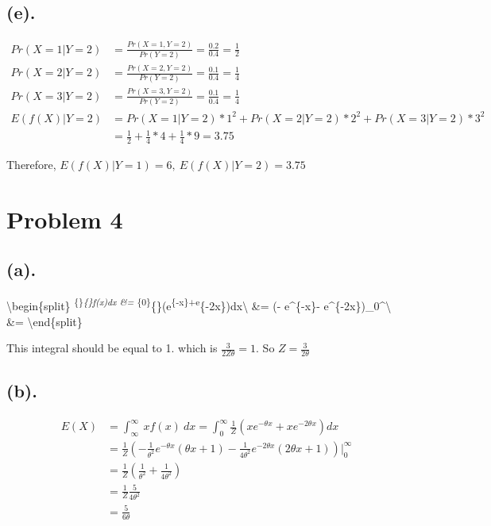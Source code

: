 \documentclass[11pt]{article}
\begin{document}
    \hypertarget{e.}{%
\subsection{(e).}\label{e.}}

\begin{align*}
Pr(X = 1 | Y = 2) &= \frac{Pr(X=1,Y=2)}{Pr(Y=2)}=\frac{0.2}{0.4}=\frac{1}{2}\\
Pr(X = 2 | Y = 2) &= \frac{Pr(X=2,Y=2)}{Pr(Y=2)}=\frac{0.1}{0.4}=\frac{1}{4}\\
Pr(X = 3 | Y = 2) &= \frac{Pr(X=3,Y=2)}{Pr(Y=2)}=\frac{0.1}{0.4}=\frac{1}{4}\\
E(f(X)|Y=2) &= Pr(X = 1 | Y = 2)*1^2+Pr(X = 2 | Y = 2)*2^2+Pr(X = 3 | Y = 2)*3^2\\
&=\frac{1}{2}+\frac{1}{4}*4+\frac{1}{4}*9=3.75
\end{align*}

Therefore, \(E(f(X)|Y=1) =6,~E(f(X)|Y=2)=3.75\)

    \hypertarget{problem-4}{%
\section{Problem 4}\label{problem-4}}

    \hypertarget{a.}{%
\subsection{(a).}\label{a.}}

\textbackslash{}begin\{split\}
\int\textsuperscript{\{\infty\}\emph{\{\infty\}f(x)dx \&=
\int}\{0\}}\{\infty\}(e\textsuperscript{\{-\theta x\}+e}\{-2\theta x\})dx\textbackslash{}
\&= (-  e\^{}\{-\theta x\}-
e\^{}\{-2\theta x\})\Big\textbar{}\_0\^{}\infty\textbackslash{}
\&= \textbackslash{}end\{split\}

    This integral should be equal to 1. which is \(\frac{3}{2Z\theta}=1\).
So \(Z=\frac{3}{2\theta}\)

    \hypertarget{b.}{%
\subsection{(b).}\label{b.}}

\begin{align*}
E(X)&=\int^{\infty}_{\infty}~xf(x)~dx = \int_{0}^{\infty}\frac{1}{Z}(xe^{-\theta x}+xe^{-2\theta x})dx\\
&=\frac{1}{Z} (-\frac{1}{\theta^2} e^{-\theta x}(\theta x+1)-\frac{1}{4\theta^2} e^{-2\theta x}(2\theta x+1))\Big|_0^\infty\\
&=\frac{1}{Z}(\frac{1}{\theta^2}+\frac{1}{4\theta^2})\\
&=\frac{1}{Z}\frac{5}{4\theta^2}\\
&=\frac{5}{6\theta}\\
\end{align*}
\end{document}
